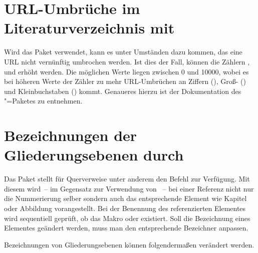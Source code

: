 \section{URL-Umbrüche im Literaturverzeichnis mit }
%
Wird das Paket  verwendet, kann es unter Umständen dazu 
kommen, das eine URL nicht vernünftig umbrochen werden. Ist dies der Fall, 
können die Zählern ,  und 
 erhöht werden. Die möglichen Werte liegen zwischen 0 
und 10000, wobei es bei höheren Werte der Zähler zu mehr URL-Umbrüchen an 
Ziffern (), Groß- () und 
Kleinbuchstaben () kommt. Genaueres hierzu ist der 
Dokumentation des "=Paketes zu entnehmen.



\section{Bezeichnungen der Gliederungsebenen durch }
%
Das Paket  stellt für Querverweise unter anderem den Befehl 
 zur Verfügung. Mit diesem wird~-- im 
Gegensatz zur Verwendung von ~-- bei einer Referenz nicht nur die 
Nummerierung selber sondern auch das entsprechende Element wie Kapitel oder 
Abbildung vorangestellt. Bei der Benennung des referenzierten Elementes wird 
sequentiell geprüft, ob das Makro \Macro*{}
oder \Macro*{} existiert. Soll die Bezeichnung 
eines Elementes geändert werden, muss man den entsprechende Bezeichner anpassen.
%
\begin{Example}
Bezeichnungen von Gliederungsebenen können folgendermaßen verändert werden.
\begin{Code}
\end{Code}
\end{Example}



